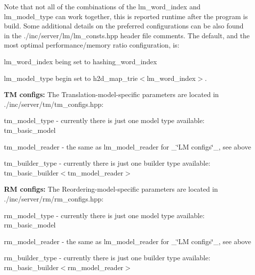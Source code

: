 Note that not all of the combinations of the {\ttfamily lm\+\_\+word\+\_\+index} and {\ttfamily lm\+\_\+model\+\_\+type} can work together, this is reported runtime after the program is build. Some additional details on the preferred configurations can be also found in the {\ttfamily ./inc/server/lm/lm\+\_\+consts.hpp} header file comments. The default, and the most optimal performance/memory ratio configuration, is\+:


\begin{DoxyItemize}
\item {\ttfamily lm\+\_\+word\+\_\+index} being set to {\ttfamily hashing\+\_\+word\+\_\+index}
\item {\ttfamily lm\+\_\+model\+\_\+type} begin set to {\ttfamily h2d\+\_\+map\+\_\+trie$<$lm\+\_\+word\+\_\+index$>$}.
\end{DoxyItemize}

{\bfseries T\+M configs\+:} The Translation-\/model-\/specific parameters are located in {\ttfamily ./inc/server/tm/tm\+\_\+configs.hpp}\+:


\begin{DoxyItemize}
\item {\ttfamily tm\+\_\+model\+\_\+type} -\/ currently there is just one model type available\+: {\ttfamily tm\+\_\+basic\+\_\+model}
\item {\ttfamily tm\+\_\+model\+\_\+reader} -\/ the same as {\ttfamily lm\+\_\+model\+\_\+reader} for \+\_\+\char`\"{}\+L\+M configs\char`\"{}\+\_\+, see above
\item {\ttfamily tm\+\_\+builder\+\_\+type} -\/ currently there is just one builder type available\+: {\ttfamily tm\+\_\+basic\+\_\+builder$<$tm\+\_\+model\+\_\+reader$>$}
\end{DoxyItemize}

{\bfseries R\+M configs\+:} The Reordering-\/model-\/specific parameters are located in {\ttfamily ./inc/server/rm/rm\+\_\+configs.hpp}\+:


\begin{DoxyItemize}
\item {\ttfamily rm\+\_\+model\+\_\+type} -\/ currently there is just one model type available\+: {\ttfamily rm\+\_\+basic\+\_\+model}
\item {\ttfamily rm\+\_\+model\+\_\+reader} -\/ the same as {\ttfamily lm\+\_\+model\+\_\+reader} for \+\_\+\char`\"{}\+L\+M configs\char`\"{}\+\_\+, see above
\item {\ttfamily rm\+\_\+builder\+\_\+type} -\/ currently there is just one builder type available\+: {\ttfamily rm\+\_\+basic\+\_\+builder$<$rm\+\_\+model\+\_\+reader$>$}
\end{DoxyItemize}

